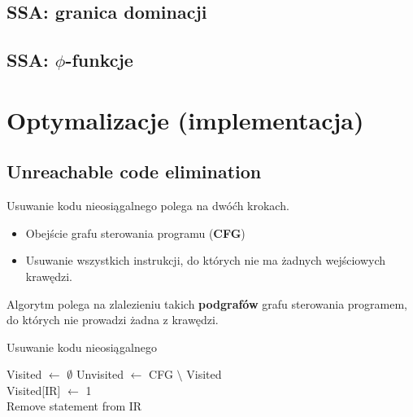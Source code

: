 \documentclass[leqno, 12pt]{article}
\newcommand{\spacing}{\vskip 0.5cm}
\begin{document}
				\subsection{SSA: granica dominacji}
				
				\subsection{SSA: $\phi$-funkcje}
					
	\section{Optymalizacje (implementacja)}
		\subsection{Unreachable code elimination}
		
			Usuwanie kodu nieosiągalnego polega na dwóćh krokach.
			\begin{itemize}
				\item Obejście grafu sterowania programu (\textbf{CFG})
				\item Usuwanie wszystkich instrukcji, do których nie ma żadnych wejściowych krawędzi.
			\end{itemize}
			
			\spacing

			Algorytm polega na zlalezieniu takich \textbf{podgrafów} grafu sterowania programem, do których
			nie prowadzi żadna z krawędzi.

			\begin{algorithm}
				\caption{Usuwanie kodu nieosiągalnego}
				\begin{algorithmic}[1]
						\State Visited $\gets$ $\emptyset$
						\State {}
						\State Unvisited $\gets$ CFG $\setminus$ Visited
						\State {}
					\EndProcedure
					\\
						\State Visited[IR] $\gets$ 1
							\State {}
						\EndFor
					\EndProcedure
					\\
							\State Remove statement from IR
						\EndFor
					\EndProcedure
				\end{algorithmic}
			\end{algorithm}
\end{document}
